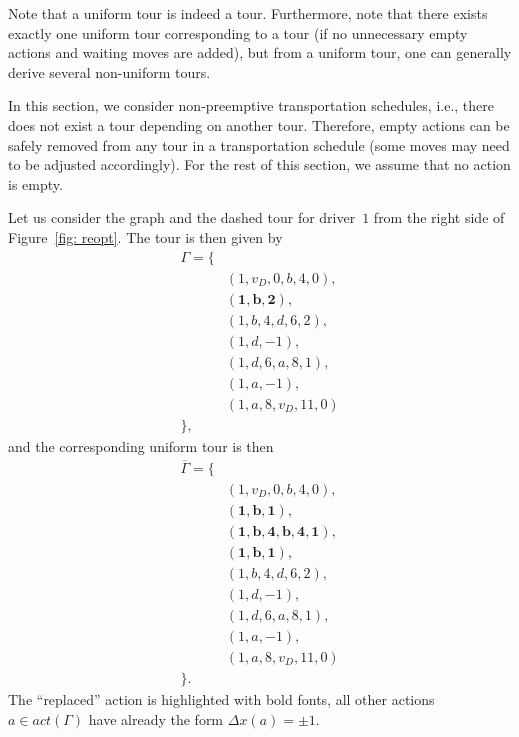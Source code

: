 \documentclass[english]{llncs}
\numberwithin{sublemma}{lemma}
\newcommand{\acnum}{\ensuremath{\Delta x}}
\newcommand{\tourd}{\ensuremath{\Gamma}}
\newcommand{\tact}{\ensuremath{act}}
\begin{document}
Note that a uniform tour is indeed a tour.
Furthermore, note that there exists exactly one uniform tour corresponding to a tour (if no unnecessary empty actions and waiting moves are added), but from a uniform tour, one can generally derive several non-uniform tours.

In this section, we consider non-preemptive transportation schedules, i.e., there does not exist a tour depending on another tour.
Therefore, empty actions can be safely removed from any tour in a transportation schedule (some moves may need to be adjusted accordingly).
For the rest of this section, we assume that no action is empty.


\begin{example}\label{ex: static: reopt: uniform tour}
Let us consider the graph and the dashed tour for driver~$1$ from the right side of Figure~\ref{fig: reopt}.
The tour is then given by
\begin{align*}
 \tourd = \{& \\
            & (1, v_D, 0, b, 4, 0), \\
            & \mathbf{(1, b, 2)}, \\
            & (1, b, 4, d, 6, 2), \\
            & (1, d, -1), \\
            & (1, d, 6, a, 8, 1), \\
            & (1, a, -1), \\
            & (1, a, 8, v_D, 11, 0) \\
          \},&
\end{align*}
and the corresponding uniform tour is then
\begin{align*}
 \overline{\tourd} = \{& \\
            & (1, v_D, 0, b, 4, 0), \\
            & \mathbf{(1, b, 1)}, \\
            & \mathbf{(1, b, 4, b, 4, 1)}, \\
            & \mathbf{(1, b, 1)}, \\
            & (1, b, 4, d, 6, 2), \\
            & (1, d, -1), \\
            & (1, d, 6, a, 8, 1), \\
            & (1, a, -1), \\
            & (1, a, 8, v_D, 11, 0) \\
          \}.&
\end{align*}
The ``replaced'' action is highlighted with bold fonts, all other actions $a \in \tact(\tourd)$ have already the form $\acnum(a) = \pm 1$.
\end{example}
\end{document}
